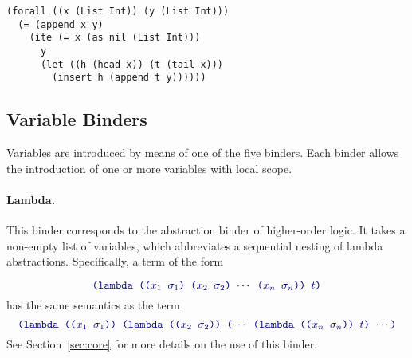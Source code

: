 \begin{lstlisting}[linewidth=29em]
(forall ((x (List Int)) (y (List Int)))
  (= (append x y)
    (ite (= x (as nil (List Int)))
      y
      (let ((h (head x)) (t (tail x)))
        (insert h (append t y))))))
\end{lstlisting}


\subsection{Variable Binders}  \label{sec:binders}

\begin{newver}

Variables are introduced by means of one of the five binders.
Each binder allows the introduction of one or more variables with local scope.

\paragraph{Lambda.}


This binder corresponds to the abstraction binder of higher-order logic.
It takes a non-empty list of variables, 
which abbreviates a sequential nesting of lambda abstractions.
Specifically, a term of the form

\begin{equation} \label{eq:lambda}
  \expr{
  (lambda (($x_1$ $\sigma_1$) ($x_2$ $\sigma_2$) $\cdots$ ($x_n$ $\sigma_n$)) 
    $t$)
  }
\end{equation}
has the same semantics as the term
%
  \begin{equation} \label{eq:nested-lambda}
  \expr{
   (lambda (($x_1$ $\sigma_1$)) 
   (lambda (($x_2$ $\sigma_2$)) ($\cdots$ 
   (lambda (($x_n$ $\sigma_n$)) $t$) $\cdots$)
  }
  \end{equation}
  See Section~\ref{sec:core} for more details on the use of this binder.

\end{newver}

